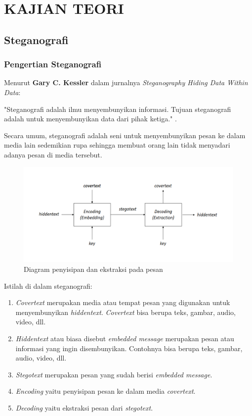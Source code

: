 
\chapter{KAJIAN TEORI}                

\section{Steganografi}
	\subsection{Pengertian Steganografi}
	Menurut \textbf{Gary C. Kessler} dalam jurnalnya \emph{Steganography Hiding Data Within Data}:
	
	"Steganografi adalah ilmu menyembunyikan informasi. Tujuan steganografi adalah untuk menyembunyikan data dari pihak ketiga." \cite{kessler}.
	
	Secara umum, steganografi adalah seni untuk menyembunyikan pesan ke dalam media lain sedemikian rupa sehingga membuat orang lain tidak menyadari adanya pesan di media tersebut.
	
	\begin{figure}[H]
		\centering
		\includegraphics[width=1\textwidth]{gambar/diagram_steganografi}
		\caption{Diagram penyisipan dan ekstraksi pada pesan}
		\label{diagram_steganografi}
	\end{figure} 
	
	Istilah di dalam steganografi:
	\begin{enumerate}
		\item \emph{Covertext} merupakan media atau tempat pesan yang digunakan untuk menyembunyikan \emph{hiddentext}. \emph{Covertext} bisa berupa teks, gambar, audio, video, dll.
		\item \emph{Hiddentext}	atau biasa disebut \emph{embedded message} merupakan pesan atau informasi yang ingin disembunyikan. Contohnya bisa berupa teks, gambar, audio, video, dll.
		\item \emph{Stegotext} merupakan pesan yang sudah berisi \emph{embedded message}.
		\item \emph{Encoding} yaitu penyisipan pesan ke dalam media \emph{covertext}.
		\item \emph{Decoding} yaitu ekstraksi pesan dari \emph{stegotext}.
	\end{enumerate}
	

